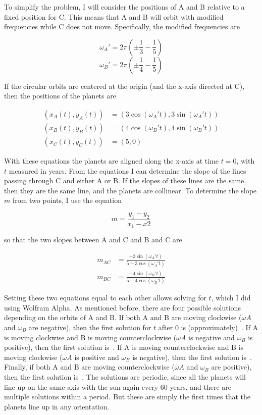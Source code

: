 \documentclass{article}
\begin{document}
To simplify the problem, I will consider the positions of A and B relative to a fixed position for C.
This means that A and B will orbit with modified frequencies while C does not move.
Specifically, the modified frequencies are

\[
\omega_{A}'=2\pi\left(\pm\frac{1}{3}-\frac{1}{5}\right)
\]
\[
\omega_{B}'=2\pi\left(\pm\frac{1}{4}-\frac{1}{5}\right)
\]

If the circular orbits are centered at the origin (and the x-axis directed at C), then the positions of the planets are

\begin{align*}
\left(x_{A}(t),y_{A}(t)\right)&=\left(3\cos(\omega_{A}'t),3\sin(\omega_{A}'t)\right) \\
\left(x_{B}(t),y_{B}(t)\right)&=\left(4\cos(\omega_{B}'t),4\sin(\omega_{B}'t)\right) \\
\left(x_{C}(t),y_{C}(t)\right)&=(5,0)
\end{align*}

With these equations the planets are aligned along the x-axis at time $t=0$, with $t$ measured in years.
From the equations I can determine the slope of the lines passing through C and either A or B.
If the slopes of these lines are the same, then they are the same line, and the planets are collinear.
To determine the slope $m$ from two points, I use the equation

\[
m=\frac{y_{1}-y_{2}}{x_{1}-x{2}}
\]

so that the two slopes between A and C and B and C are

\begin{align*}
m_{AC}&=\frac{-3\sin(\omega_{A}'t)}{5-3\cos(\omega_{A}'t)} \\
m_{BC}&=\frac{-4\sin(\omega_{B}'t)}{5-4\cos(\omega_{B}'t)}
\end{align*}

Setting these two equations equal to each other allows solving for $t$, which I did using Wolfram Alpha.
As mentioned before, there are four possible solutions depending on the orbits of A and B.
If both A and B are moving clockwise ($\omega{A}$ and $\omega_{B}$ are negative), then the first solution for $t$ after 0 is (approximately)
\,.
If A is moving clockwise and B is moving counterclockwise ($\omega{A}$ is negative and $\omega_{B}$ is positive), then the first solution is
\,.
If A is moving counterclockwise and B is moving clockwise ($\omega{A}$ is positive and $\omega_{B}$ is negative), then the first solution is
\,.
Finally, if both A and B are moving counterclockwise ($\omega{A}$ and $\omega_{B}$ are positive), then the first solution is
\,.
The solutions are periodic, since all the planets will line up on the same axis with the sun again every 60 years, and there are multiple solutions within a period.
But these are simply the first times that the planets line up in any orientation.
\end{document}
